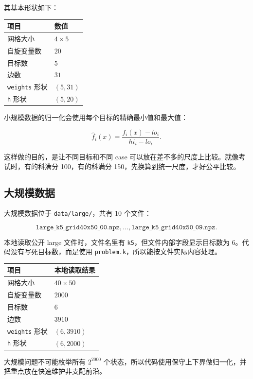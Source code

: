 \documentclass[UTF8,zihao=-4]{ctexart}
\newcommand{\code}[1]{\texttt{#1}}
\begin{document}
其基本形状如下：

\begin{center}
\begin{tabular}{ll}
\toprule
项目 & 数值 \\
\midrule
网格大小 & \(4\times 5\) \\
自旋变量数 & \(20\) \\
目标数 & \(5\) \\
边数 & \(31\) \\
\code{weights} 形状 & \((5,31)\) \\
\code{h} 形状 & \((5,20)\) \\
\bottomrule
\end{tabular}
\end{center}

小规模数据的归一化会使用每个目标的精确最小值和最大值：

\[
\hat f_i(x)=\frac{f_i(x)-lo_i}{hi_i-lo_i}.
\]

这样做的目的，是让不同目标和不同 case 可以放在差不多的尺度上比较。就像考试时，有的科满分 100，有的科满分 150，先换算到统一尺度，才好公平比较。

\subsection{大规模数据}

大规模数据位于 \code{data/large/}，共有 10 个文件：

\[
\code{large\_k5\_grid40x50\_00.npz},\ldots,\code{large\_k5\_grid40x50\_09.npz}.
\]

本地读取公开 large 文件时，文件名里有 \code{k5}，但文件内部字段显示目标数为 \(6\)。代码没有写死目标数，而是使用 \code{problem.k}，所以能按文件实际内容处理。

\begin{center}
\begin{tabular}{ll}
\toprule
项目 & 本地读取结果 \\
\midrule
网格大小 & \(40\times 50\) \\
自旋变量数 & \(2000\) \\
目标数 & \(6\) \\
边数 & \(3910\) \\
\code{weights} 形状 & \((6,3910)\) \\
\code{h} 形状 & \((6,2000)\) \\
\bottomrule
\end{tabular}
\end{center}

大规模问题不可能枚举所有 \(2^{2000}\) 个状态，所以代码使用保守上下界做归一化，并把重点放在快速维护非支配前沿。
\end{document}
